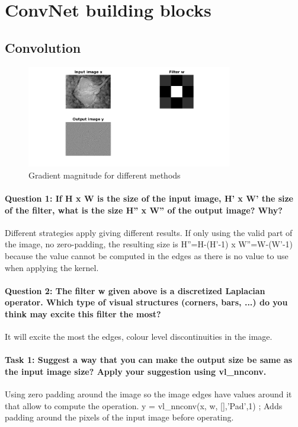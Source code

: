 \documentclass[12pt]{article}
\begin{document}
\maketitle

\section{ConvNet building blocks}
\subsection{Convolution}

\begin{figure}[htbp]
 \centering
 \includegraphics[width=0.8\textwidth]{conv}
 \caption{Gradient magnitude for different methods}
 \label{fig:q1}
\end{figure}

\paragraph{Question 1: If H x W is the size of the input image, H' x W' the size of the filter, what is the size H'' x W'' of the output image? Why?}
Different strategies apply giving different results. If only using the valid part of the image, no zero-padding, the resulting size is H''=H-(H'-1) x W''=W-(W'-1) because the value cannot be computed in the edges as there is no value to use when applying the kernel.
\paragraph{Question 2: The filter w given above is a discretized Laplacian operator. Which type of visual structures (corners, bars, ...) do you think may excite this filter the most?}
It will excite the most the edges, colour level discontinuities in the image.
\paragraph{Task 1: Suggest a way that you can make the output size be same as the input image size? Apply your suggestion using vl\_nnconv.}
Using zero padding around the image so the image edges have values around it that allow to compute the operation. y = vl\_nnconv(x, w, [],'Pad',1) ; Adds padding around the pixels of the input image before operating.
\end{document}
